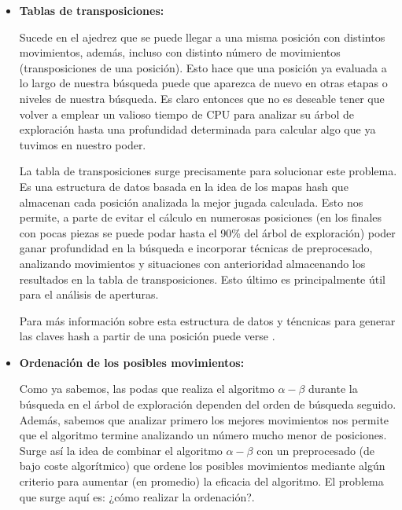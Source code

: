 \documentclass[letterpaper,12pt]{article}
\begin{document}
\begin{itemize}
    \item \textbf{Tablas de transposiciones:}
    
    Sucede en el ajedrez que se puede llegar a una misma posición con distintos movimientos,
    además, incluso con distinto número de movimientos (transposiciones de una posición). 
    Esto hace que una posición ya evaluada a lo largo de nuestra búsqueda puede que aparezca
    de nuevo en otras etapas o niveles de nuestra búsqueda. Es claro entonces que no es 
    deseable tener que volver a emplear un valioso tiempo de CPU para analizar su árbol de
    exploración hasta una profundidad determinada para calcular algo que ya tuvimos en 
    nuestro poder.
    
    La tabla de transposiciones surge precisamente para solucionar este problema. Es una 
    estructura de datos basada en la idea de los mapas hash que almacenan cada posición
    analizada la mejor jugada calculada. Esto nos permite, a parte de evitar el cálculo
    en numerosas posiciones (en los finales con pocas piezas se puede podar hasta el 90\%
    del árbol de exploración) poder ganar profundidad en la búsqueda e incorporar técnicas
    de preprocesado, analizando movimientos y situaciones con anterioridad almacenando los
    resultados en la tabla de transposiciones. Esto último es principalmente útil para el
    análisis de aperturas.
    
    Para más información sobre esta estructura de datos y téncnicas para generar las claves
    hash a partir de una posición puede verse \cite{Search4,BoardRepresentation2}.
    
    \item \textbf{Ordenación de los posibles movimientos:}
    
    Como ya sabemos, las podas que realiza el algoritmo $\alpha-\beta$ durante la búsqueda
    en el árbol de exploración dependen del orden de búsqueda seguido. Además, sabemos que
    analizar primero los mejores movimientos nos permite que el algoritmo termine analizando
    un número mucho menor de posiciones. Surge así la idea de combinar el algoritmo 
    $\alpha-\beta$ con un preprocesado (de bajo coste algorítmico) que ordene los posibles
    movimientos mediante algún criterio para aumentar (en promedio) la eficacia del algoritmo. 
    El problema que surge aquí es: ¿cómo realizar la ordenación?.
    

\end{itemize}
\end{document}
